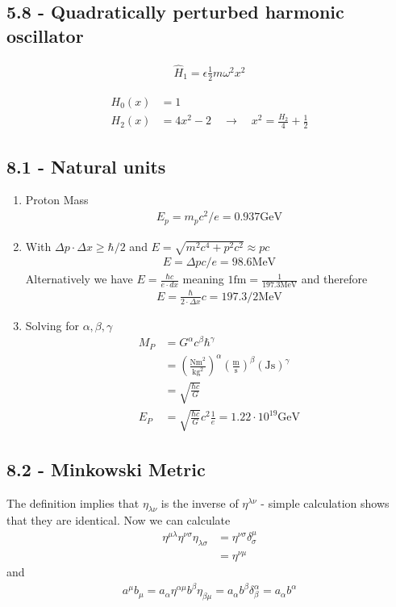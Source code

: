 \documentclass[10pt,a4paper]{book}
\theoremstyle{definition}
\begin{document}
\subsection{5.8 - Quadratically perturbed harmonic oscillator}
\begin{align}
\hat{H}_1=\epsilon\frac{1}{2}m\omega^2x^2
\end{align}

\begin{align}
H_0(x)&=1\\
H_2(x)&=4x^2-2\quad\rightarrow\quad x^2=\frac{H_2}{4}+\frac{1}{2}
\end{align}


\subsection{8.1 - Natural units}
\begin{enumerate}
\item Proton Mass
\begin{align}
      E_p=m_pc^2/e=0.937\text{GeV}
\end{align}
\item With $\Delta p\cdot\Delta x\ge\hbar/2$ and $E=\sqrt{m^2c^4+p^2c^2}\approx pc$
\begin{align}
	E=\Delta p c/e=98.6\text{MeV}
\end{align}
Alternatively we have $E=\frac{\hbar c}{e\cdot dx}$ meaning $1\text{fm}=\frac{1}{197.3\text{MeV}}$ and therefore
\begin{align}
	E=\frac{\hbar}{2\cdot\Delta x}c=197.3/2\text{MeV}
\end{align}
\item Solving for $\alpha,\beta,\gamma$
\begin{align}
	M_P
	&=G^\alpha c^\beta \hbar^\gamma\\
	&=\left(\frac{\text{Nm}^2}{\text{kg}^2}\right)^\alpha\left(\frac{\text{m}}{\text{s}}\right)^\beta\left(\text{Js}\right)^\gamma\\
	&=\sqrt{\frac{\hbar c}{G}}\\
	E_P&=\sqrt{\frac{\hbar c}{G}}c^2\frac{1}{e}=1.22\cdot10^{19}\text{GeV}
\end{align}
\end{enumerate}
\subsection{8.2 - Minkowski Metric}
The definition implies that $\eta_{\lambda\nu}$ is the inverse of $\eta^{\lambda\nu}$ - simple calculation shows that they are identical. Now we can calculate
\begin{align}
\eta^{\mu\lambda}\eta^{\nu\sigma}\eta_{\lambda\sigma}
&=\eta^{\nu\sigma}\delta^\mu_\sigma\\
&=\eta^{\nu\mu}
\end{align}
and
\begin{align}
a^\mu b_\mu=a_\alpha\eta^{\alpha\mu}b^\beta\eta_{\beta\mu}=a_\alpha b^\beta\delta^\alpha_\beta=a_\alpha b^\alpha
\end{align}
\end{document}
